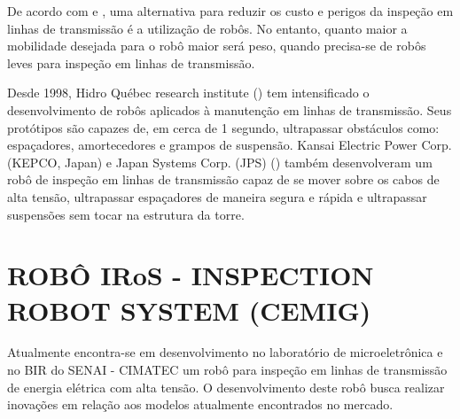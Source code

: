 \documentclass[12pt,oneside,a4paper, chapter=TITLE, section = TITLE, english, brazil]{abntex2}
\begin{document}
De acordo com  e , uma alternativa para reduzir os custo e perigos da inspeção em linhas de transmissão é a utilização de robôs. No entanto, quanto maior a mobilidade desejada para o robô maior será peso, quando precisa-se de robôs leves para inspeção em linhas de transmissão.

Desde 1998, Hidro Québec research institute (\cite{transmission}) tem intensificado o desenvolvimento de robôs aplicados à manutenção em linhas de transmissão. Seus protótipos são capazes de, em cerca de 1 segundo, ultrapassar obstáculos como: espaçadores, amortecedores e grampos de suspensão. Kansai Electric Power Corp. (KEPCO, Japan) e Japan Systems Corp. (JPS) (\cite{expliner}) também desenvolveram um robô de inspeção em linhas de transmissão capaz de se mover sobre os cabos de alta tensão, ultrapassar espaçadores de maneira segura e rápida e ultrapassar suspensões sem tocar na estrutura da torre.


\section{ROBÔ IRoS - INSPECTION ROBOT SYSTEM (CEMIG)} %




Atualmente encontra-se em desenvolvimento no laboratório de microeletrônica e no BIR do SENAI - CIMATEC um robô para inspeção em linhas de transmissão de energia elétrica com alta tensão. O desenvolvimento deste robô busca realizar inovações em relação aos modelos atualmente encontrados no mercado.
\end{document}
